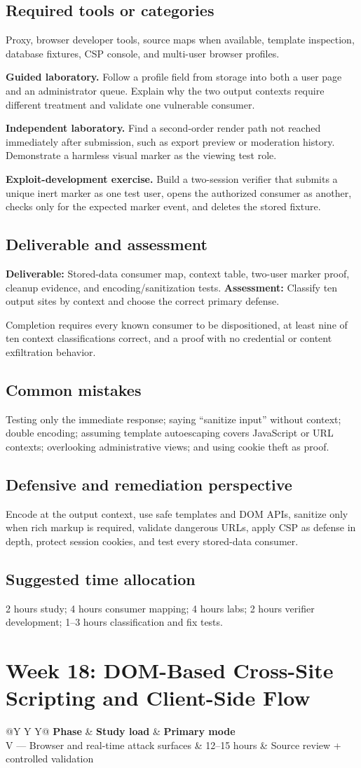 \documentclass[11pt]{article}
\makeatletter
\newcommand{\weekheader}[4]{%
  \clearpage
  \section{Week #1: #2}
  \begin{tcolorbox}[colback=Navy,colframe=Navy,coltext=white]
    \begin{tabularx}{\linewidth}{@{}Y Y Y@{}}
      \textbf{Phase} & \textbf{Study load} & \textbf{Primary mode}\\
      #3 & #4 hours & Source review + controlled validation
    \end{tabularx}
  \end{tcolorbox}
}
\newcommand{\weekfield}[2]{%
  \Needspace{5\baselineskip}
  \subsection*{#1}
  #2
}
\newcommand{\deliverable}[1]{\textbf{Deliverable:} #1}
\newcommand{\assessment}[1]{\textbf{Assessment:} #1}
\makeatother
\begin{document}
\weekfield{Required tools or categories}{Proxy, browser developer tools, source
maps when available, template inspection, database fixtures, CSP console, and
multi-user browser profiles.}

\begin{labbox}
\textbf{Guided laboratory.} Follow a profile field from storage into both a user
page and an administrator queue. Explain why the two output contexts require
different treatment and validate one vulnerable consumer.

\textbf{Independent laboratory.} Find a second-order render path not reached
immediately after submission, such as export preview or moderation history.
Demonstrate a harmless visual marker as the viewing test role.

\textbf{Exploit-development exercise.} Build a two-session verifier that submits
a unique inert marker as one test user, opens the authorized consumer as another,
checks only for the expected marker event, and deletes the stored fixture.
\end{labbox}

\weekfield{Deliverable and assessment}{\deliverable{Stored-data consumer map,
context table, two-user marker proof, cleanup evidence, and encoding/sanitization
tests.} \assessment{Classify ten output sites by context and choose the correct
primary defense.}}

\begin{checkpoints}
Completion requires every known consumer to be dispositioned, at least nine of
ten context classifications correct, and a proof with no credential or content
exfiltration behavior.
\end{checkpoints}

\weekfield{Common mistakes}{Testing only the immediate response; saying
``sanitize input'' without context; double encoding; assuming template
autoescaping covers JavaScript or URL contexts; overlooking administrative views;
and using cookie theft as proof.}

\weekfield{Defensive and remediation perspective}{Encode at the output context,
use safe templates and DOM APIs, sanitize only when rich markup is required,
validate dangerous URLs, apply CSP as defense in depth, protect session cookies,
and test every stored-data consumer.}

\weekfield{Suggested time allocation}{2 hours study; 4 hours consumer mapping; 4
hours labs; 2 hours verifier development; 1--3 hours classification and fix tests.}

\weekheader{18}{DOM-Based Cross-Site Scripting and Client-Side Flow}{V --- Browser and real-time attack surfaces}{12--15}
\end{document}
